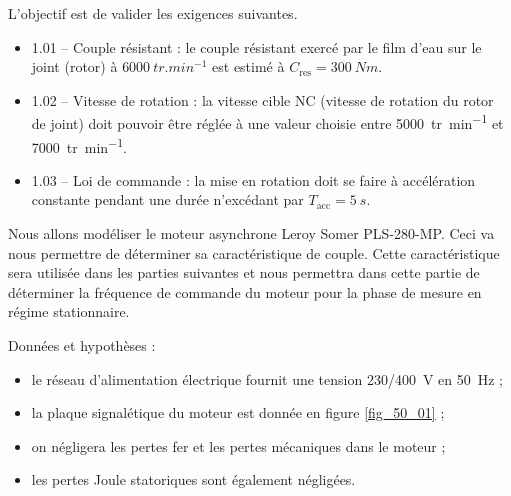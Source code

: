 \normaltrue \difficilefalse \tdifficilefalse
\correctionfalse

\setcounter{question}{0}
\ifcorrection
\else
{}
\fi

\ifprof
\else



\begin{obj}
L'objectif est de valider les exigences suivantes.
\begin{itemize}
\item 1.01 -- Couple résistant : le couple résistant exercé par le film d’eau sur le joint (rotor) à $\SI{6000}{tr.min^{-1}}$  est estimé à $C_{\text{res}} = \SI{300}{Nm}$.
\item 1.02 -- Vitesse de rotation : la vitesse cible NC (vitesse de rotation du rotor de joint) doit
pouvoir être réglée à une valeur choisie entre \SI{5000}{tr.min^{-1}} 
et \SI{7000}{tr.min^{-1}}.
\item 1.03 -- Loi de commande : la mise en rotation doit se faire à accélération constante pendant une durée n’excédant par $T_{\text{acc}} = \SI{5}{s}$.
\end{itemize}

Nous allons modéliser le moteur asynchrone Leroy Somer
PLS-280-MP. Ceci va nous permettre de déterminer sa caractéristique de couple. Cette
caractéristique sera utilisée dans les parties suivantes et nous permettra dans cette partie
de déterminer la fréquence de commande du moteur pour la phase de mesure en régime
stationnaire.
\end{obj}


Données et hypothèses :
\begin{itemize}
\item le réseau d’alimentation électrique fournit une tension 230/\SI{400}{V} en \SI{50}{Hz} ;
\item la plaque signalétique du moteur est donnée en figure \autoref{fig_50_01} ;
\item on négligera les pertes fer et les pertes mécaniques dans le moteur ;
\item les pertes Joule statoriques sont également négligées.
\end{itemize}

